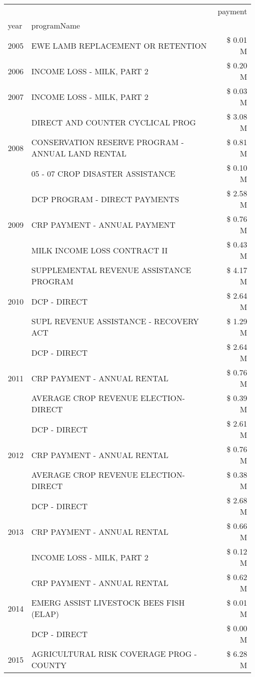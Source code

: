 \begin{tabular}{llr}
\toprule
 &  & payment \\
year & programName &  \\
\midrule
2005 & EWE LAMB REPLACEMENT OR RETENTION & \$ 0.01 M \\
\cline{1-3}
2006 & INCOME LOSS - MILK, PART 2 & \$ 0.20 M \\
\cline{1-3}
2007 & INCOME LOSS - MILK, PART 2 & \$ 0.03 M \\
\cline{1-3}
\multirow[t]{3}{*}{2008} & DIRECT AND COUNTER CYCLICAL PROG & \$ 3.08 M \\
 & CONSERVATION RESERVE PROGRAM - ANNUAL LAND RENTAL & \$ 0.81 M \\
 & 05 - 07 CROP DISASTER ASSISTANCE & \$ 0.10 M \\
\cline{1-3}
\multirow[t]{3}{*}{2009} & DCP PROGRAM - DIRECT PAYMENTS & \$ 2.58 M \\
 & CRP PAYMENT - ANNUAL PAYMENT & \$ 0.76 M \\
 & MILK INCOME LOSS CONTRACT II & \$ 0.43 M \\
\cline{1-3}
\multirow[t]{3}{*}{2010} & SUPPLEMENTAL REVENUE ASSISTANCE PROGRAM & \$ 4.17 M \\
 & DCP - DIRECT & \$ 2.64 M \\
 & SUPL REVENUE ASSISTANCE - RECOVERY ACT & \$ 1.29 M \\
\cline{1-3}
\multirow[t]{3}{*}{2011} & DCP - DIRECT & \$ 2.64 M \\
 & CRP PAYMENT - ANNUAL RENTAL & \$ 0.76 M \\
 & AVERAGE CROP REVENUE ELECTION-DIRECT & \$ 0.39 M \\
\cline{1-3}
\multirow[t]{3}{*}{2012} & DCP - DIRECT & \$ 2.61 M \\
 & CRP PAYMENT - ANNUAL RENTAL & \$ 0.76 M \\
 & AVERAGE CROP REVENUE ELECTION-DIRECT & \$ 0.38 M \\
\cline{1-3}
\multirow[t]{3}{*}{2013} & DCP - DIRECT & \$ 2.68 M \\
 & CRP PAYMENT - ANNUAL RENTAL & \$ 0.66 M \\
 & INCOME LOSS - MILK, PART 2 & \$ 0.12 M \\
\cline{1-3}
\multirow[t]{3}{*}{2014} & CRP PAYMENT - ANNUAL RENTAL & \$ 0.62 M \\
 & EMERG ASSIST LIVESTOCK BEES FISH (ELAP) & \$ 0.01 M \\
 & DCP - DIRECT & \$ 0.00 M \\
\cline{1-3}
\multirow[t]{3}{*}{2015} & AGRICULTURAL RISK COVERAGE PROG - COUNTY & \$ 6.28 M \\

\end{tabular}
